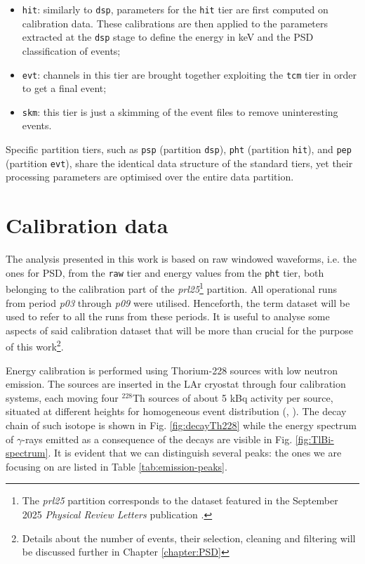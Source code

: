\begin{itemize}
    \item \texttt{hit}: similarly to \texttt{dsp}, parameters for the \texttt{hit} tier are first computed on calibration data. These calibrations are then applied to the parameters extracted at the \texttt{dsp} stage to define the energy in keV and the PSD classification of events;
    \item \texttt{evt}: channels in this tier are brought together exploiting the \texttt{tcm} tier in order to get a final event;
    \item \texttt{skm}: this tier is just a skimming of the event files to remove uninteresting events.
\end{itemize} 
Specific partition tiers, such as \texttt{psp} (partition \texttt{dsp}), \texttt{pht} (partition \texttt{hit}), and \texttt{pep} (partition \texttt{evt}), share the identical data structure of the standard tiers, yet their processing parameters are optimised over the entire data partition.


\section{Calibration data}
The analysis presented in this work is based on raw windowed waveforms, i.e. the ones for \ac{PSD}, from the \texttt{raw} tier and energy values from the \texttt{pht} tier, both belonging to the calibration part of the \textit{prl25}\footnote{The \textit{prl25} partition corresponds to the dataset featured in the September 2025 \textit{Physical Review Letters} publication \cite{L200-sep25}.} partition. All operational runs from period \textit{p03} through \textit{p09} were utilised. Henceforth, the term dataset will be used to refer to all the runs from these periods.
It is useful to analyse some aspects of said calibration dataset that will be more than crucial for the purpose of this work\footnote{Details about the number of events, their selection, cleaning and filtering will be discussed further in Chapter \ref{chapter:PSD}}.

Energy calibration is performed using Thorium-228 sources with low neutron emission. The sources are inserted in the LAr cryostat through four calibration systems, each moving four ${}^{228}$Th sources of about 5 kBq activity per source, situated at different heights for homogeneous event distribution (\cite{L200:calibration}, \cite{LEGEND:GeDet}). The decay chain of such isotope is shown in Fig. \ref{fig:decayTh228} while the energy spectrum of $\gamma$-rays emitted as a consequence of the decays are visible in Fig. \ref{fig:TlBi-spectrum}. It is evident that we can distinguish several peaks: the ones we are focusing on are listed in Table \ref{tab:emission-peaks}.

